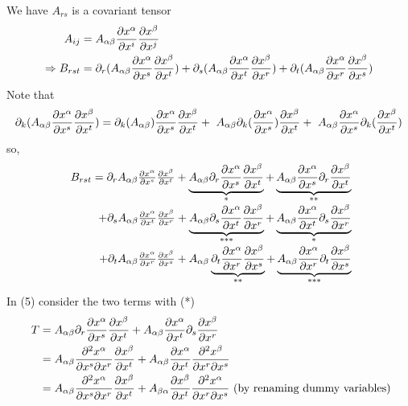 We have $A_{rs}$ is a covariant tensor
\begin{align}
\ A_{ij} &= A_{\alpha\beta}\pdv{x^{\alpha}}{x^{i}}\pdv{x^{\beta}}{x^{j}}\\
\Rightarrow B_{rst} &= \partial_{r}{(A_{\alpha\beta}\pdv{x^{\alpha}}{x^{s}}\pdv{x^{\beta}}{x^{t}})} + \partial_{s}{(A_{\alpha\beta}\pdv{x^{\alpha}}{x^{t}}\pdv{x^{\beta}}{x^{r}})} +\partial_{t}{(A_{\alpha\beta}\pdv{x^{\alpha}}{x^{r}}\pdv{x^{\beta}}{x^{s}})}
\end{align}
Note that
\begin{align}
\partial_{k}{(A_{\alpha\beta}\pdv{x^{\alpha}}{x^{s}}\pdv{x^{\beta}}{x^{t}})} = 
\partial_{k}{(A_{\alpha\beta})}\pdv{x^{\alpha}}{x^{s}}\pdv{x^{\beta}}{x^{t}}+
\ A_{\alpha\beta}\partial_{k}{(\pdv{x^{\alpha}}{x^{s}})}\pdv{x^{\beta}}{x^{t}}+
\ A_{\alpha\beta}\pdv{x^{\alpha}}{x^{s}} \partial_{k}{(\pdv{x^{\beta}}{x^{t}})}\\
\end{align}
so, 
\begin{align}
\begin{array}{r c l}
\ B_{rst} = \partial_{r}{A_{\alpha\beta}}\pdv{x^{\alpha}}{x^{s}}\pdv{x^{\beta}}{x^{t}}+ \underbrace{A_{\alpha\beta}\partial_{r}{\pdv{x^{\alpha}}{x^{s}}}\pdv{x^{\beta}}{x^{t}}}_\text{*} +\underbrace{A_{\alpha\beta}\pdv{x^{\alpha}}{x^{s}}\partial_{r}{\pdv{x^{\beta}}{x^{t}}}}_\text{**}\\ +
\partial_{s}{A_{\alpha\beta}}\pdv{x^{\alpha}}{x^{t}}\pdv{x^{\beta}}{x^{r}}+\underbrace{A_{\alpha\beta}\partial_{s}{\pdv{x^{\alpha}}{x^{t}}}\pdv{x^{\beta}}{x^{r}}}_\text{***}+\underbrace{A_{\alpha\beta}\pdv{x^{\alpha}}{x^{t}}\partial_{s}{\pdv{x^{\beta}}{x^{r}}}}_\text{*}\\+
\partial_{t}{A_{\alpha\beta}}\pdv{x^{\alpha}}{x^{r}}\pdv{x^{\beta}}{x^{s}}+A_{\alpha\beta}\underbrace{\partial_{t}{\pdv{x^{\alpha}}{x^{r}}}\pdv{x^{\beta}}{x^{s}}}_\text{**}+\underbrace{A_{\alpha\beta}\pdv{x^{\alpha}}{x^{r}}\partial_{t}{\pdv{x^{\beta}}{x^{s}}}}_\text{***}
\end{array}
\end{align}
In (5) consider the two terms with (*) 
\begin{align}
\ T &= A_{\alpha\beta}\partial_{r}{\pdv{x^{\alpha}}{x^{s}}}\pdv{x^{\beta}}{x^{t}}+ A_{\alpha\beta}\pdv{x^{\alpha}}{x^{t}}\partial_{s}{\pdv{x^{\beta}}{x^{r}}}\\
& = A_{\alpha\beta}\pdv{x^{\alpha}}{x^{s}}{x^{r}}\pdv{x^{\beta}}{x^{t}}+ A_{\alpha\beta}\pdv{x^{\alpha}}{x^{t}}\pdv{x^{\beta}}{x^{r}}{x^{s}}\\
& = A_{\alpha\beta}\pdv{x^{\alpha}}{x^{s}}{x^{r}}\pdv{x^{\beta}}{x^{t}}+ A_{\beta\alpha}\pdv{x^{\beta}}{x^{t}}\pdv{x^{\alpha}}{x^{r}}{x^{s}} \text{ (by renaming dummy variables)}
\end{align}
